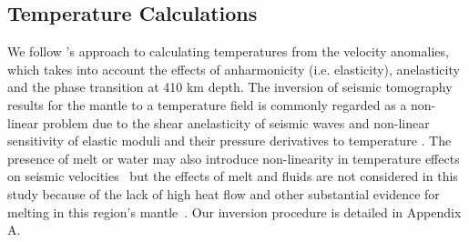 \documentclass[draft,linenumbers]{agujournal2018}
\begin{document}
\subsection{Temperature Calculations} \label{temp_var}
    We follow \citet{Cammarano2003}'s approach to calculating temperatures from the velocity anomalies, which takes into account the effects of anharmonicity (i.e. elasticity), anelasticity and the phase transition at 410 km depth. The inversion of seismic tomography results for the mantle to a temperature field is commonly regarded as a non-linear problem due to the shear anelasticity of seismic waves \citep{minster1981model, karato1993importance, sobolev1996upper, Goes_2000, artemieva2004shear} and non-linear sensitivity of elastic moduli and their pressure derivatives to temperature \citep{duffy1989seismic, anderson1992high, Cammarano2003, stixrude2005thermodynamics}. The presence of melt or water may also introduce non-linearity in temperature effects on seismic velocities~\citep{Karato_1998} but the effects of melt and fluids are not considered in this study because of the lack of high heat flow and other substantial evidence for melting in this region's mantle~\citep{blackwell2006assessment}. Our inversion procedure is detailed in Appendix A.
%
    
\end{document}
